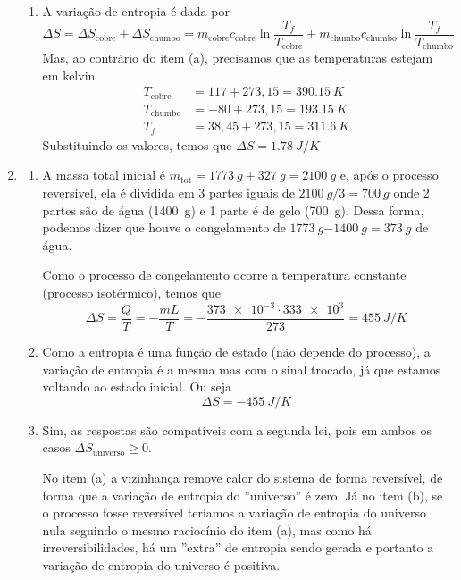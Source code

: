\documentclass[12pt,a4paper,brazilian, fleqn]{article}
\begin{document}
\begin{enumerate}
\begin{enumerate}
           \item A variação de entropia é dada por
               \[
                   \Delta S = \Delta S_\text{cobre} + \Delta S_\text{chumbo} = 
                   m_\text{cobre}c_\text{cobre}\ln\frac{T_f}{T_\text{cobre}}+
                   m_\text{chumbo}c_\text{chumbo}\ln\frac{T_f}{T_\text{chumbo}}
               \]
                Mas, ao contrário do item (a), precisamos que as temperaturas estejam em kelvin
                \begin{align*}
                    T_\text{cobre} &= 117+273,15 = \SI{390.15}{K} \\
                    T_\text{chumbo} &= -80+273,15 = \SI{193.15}{K} \\
                    T_f &= 38,45+273,15=\SI{311.6}{K}
                \end{align*}
                Substituindo os valores, temos que \(\Delta S=\SI{1.78}{J/K}\)
        \end{enumerate}

    \item%
        \begin{enumerate}
            \item A massa total inicial é \(m_\text{tot} = \SI{1773}{g}+\SI{327}{g} = \SI{2100}{g}\) e, após o processo reversível,
                ela é dividida em 3 partes iguais de \(\SI{2100}{g}/3 = \SI{700}{g}\) onde 2 partes são de água (\SI{1400}{g}) e
                1 parte é de gelo (\SI{700}{g}). Dessa forma, podemos dizer que houve o congelamento de \(\SI{1773}{g}\SI{-1400}{g}=\SI{373}{g}\) de 
                água.

                Como o processo de congelamento ocorre a temperatura constante (processo isotérmico), temos que 
                \[
                    \Delta S = \frac{Q}{T} = -\frac{m L}{T} = -\frac{\num{373e-3}\cdot \num{333e3}}{273}=\SI{455}{J/K}
                \]
            \item Como a entropia é uma função de estado (não depende do processo), a variação de entropia é a mesma mas com
                o sinal trocado, já que estamos voltando ao estado inicial. Ou seja
                \[
                    \Delta S = \SI{-455}{J/K}
                \]

            \item Sim, as respostas são compatíveis com a segunda lei, pois em
                ambos os casos \(\Delta S_\text{universo} \geq 0\). 

                No item (a) a vizinhança remove calor do sistema de forma
                reversível, de forma que a variação de entropia do ''universo''
                é zero. Já no item (b), se o processo fosse reversível teríamos
                a variação de entropia do universo nula seguindo o mesmo
                raciocínio do item (a), mas como há irreversibilidades, há um
                ''extra'' de entropia sendo gerada e portanto a variação de
                entropia do universo é positiva.


\end{enumerate}
\end{enumerate}
\end{document}
